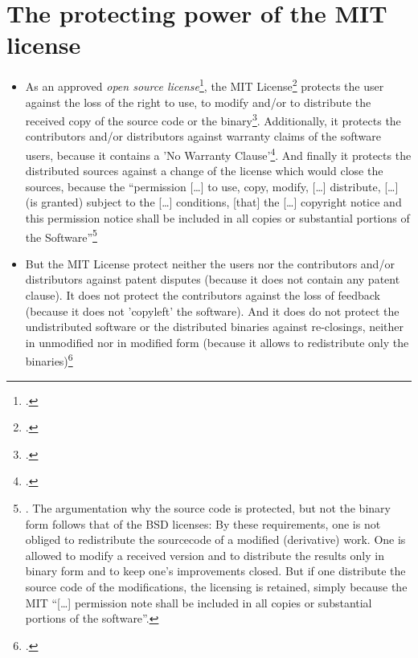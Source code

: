 \section{The protecting power of the MIT license}
\begin{itemize}
  \item As an approved \emph{open source license}\footcite[cf.][\nopage
  wp]{OSI2012b}, the MIT License\footcite[MIT has to be resolved as
  \enquote{Massachusetts Institute of Technology} 
  (cf.][\nopage wp).]{wpMitLic2011a} protects the user against the loss of the
  right to use, to modify and/or to distribute the received copy of the source
  code or the binary\footcite[cf.][\nopage wp 1ff]{OSI2012a}. Additionally, it
  protects the contributors and/or distributors against warranty claims of the
  software users, because it contains a 'No Warranty
  Clause'\footcite[cf.][\nopage wp]{MitLicense2012a}. And finally it protects
  the distributed sources against a change of the license which would close the
  sources, because the \enquote{permission [\ldots] to use, copy, modify,
  [\ldots] distribute, [\ldots] (is granted) subject to the [\ldots] conditions,
  [that] the [\ldots] copyright notice and this permission notice shall be
  included in all copies or substantial portions of the
  Software}\footnote{\cite[cf.][\nopage wp]{MitLicense2012a}. The argumentation
  why the source code is protected, but not the binary form follows that of the
  BSD licenses: By these requirements, one is not obliged to redistribute the
  sourcecode of a modified (derivative) work. One is allowed to modify a
  received version and to distribute the results only in binary form and to keep
  one's improvements closed. But if one distribute the source code of the
  modifications, the licensing is retained, simply because the MIT
  \enquote{[\ldots] permission note shall be included in all copies or
  substantial portions of the software}.}
 
  \item But the MIT License protect neither the users nor the contributors
  and/or distributors against patent disputes (because it does not contain any
  patent clause). It does not protect the contributors against the loss of
  feedback (because it does not 'copyleft' the software). And it does do not
  protect the undistributed software or the distributed binaries against
  re-closings, neither in unmodified nor in modified form (because it allows to
  redistribute only the binaries)\footcite[cf.][\nopage wp]{MitLicense2012a}
  
\end{itemize}

